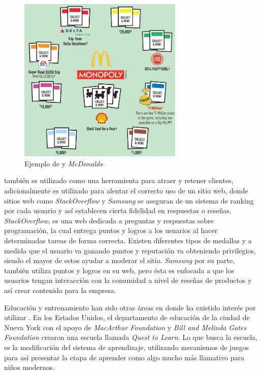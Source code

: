 \begin{figure}[!htb]
  \centering
  \includegraphics[width=0.7\textwidth]{images/Gam_mcdonalds.jpg}
  \caption[\emph{Mcdonalds} y {\gam}]{Ejemplo de {\gam} y \emph{McDonalds}}
  \label{fig:mcdonalds}
\end{figure}



{\GAM} también es utilizado como una herramienta para atraer y retener clientes,
adicionalmente es utilizado para alentar el correcto uso de un sitio web,
donde sitios web como \emph{StackOverflow} \cite{StackOverflow} y \emph{Samsung} se aseguran de un sistema
de ranking por cada usuario y así establecen cierta fidelidad en respuestas
o reseñas.
\emph{StackOverflow}, es una web dedicada a preguntas y respuestas sobre programación,
la cual entrega puntos  y logros a los usuarios al hacer determinadas tareas
de forma correcta.
Existen diferentes tipos de medallas y a medida que el usuario va ganando
puntos y reputación va obteniendo privilegios, siendo el mayor de estos ayudar a
moderar el sitio.
\emph{Samsung} por su parte, también utiliza puntos y logros en su web, pero ésta
es enfocada a que los usuarios tengan interacción con la comunidad a nivel de
reseñas de productos y así crear contenido para la empresa\cite{Gam:Util:3}.

Educación y entrenamiento han sido otras áreas en donde ha existido interés por
utilizar {\gam}.
En los Estados Unidos, el departamento de educación de la ciudad de Nueva York
con el apoyo de \emph{MacArthur Foundation} y \emph{Bill and Melinda Gates
Foundation} crearon una escuela  llamada \emph{Quest to Learn}.
Lo que busca la escuela, es la modificación del sistema de aprendizaje,
utilizando mecanismos de juegos para así presentar la etapa de aprender
como algo mucho más llamativo para niños modernos\cite{Gam:Util:4}.


